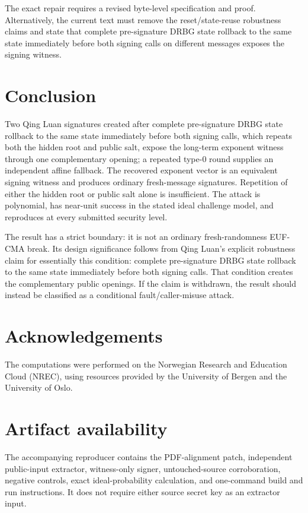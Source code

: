 \documentclass[11pt,a4paper]{article}
\begin{document}
The exact repair requires a revised byte-level specification and proof.
Alternatively, the current text must remove the reset/state-reuse robustness
claims and state that complete pre-signature DRBG state rollback to the same
state immediately before both signing calls on different messages exposes the
signing witness.

\section{Conclusion}

Two Qing Luan signatures created after complete pre-signature DRBG state
rollback to the same state immediately before both signing calls, which repeats
both the hidden root and public salt, expose the
long-term exponent witness through one complementary opening; a repeated
type-0 round supplies an independent affine fallback.  The recovered exponent
vector is an equivalent signing witness and produces ordinary fresh-message
signatures.  Repetition of either the hidden root or public salt alone is
insufficient.  The attack is polynomial, has near-unit success in the stated
ideal challenge model, and reproduces at every submitted security level.

The result has a strict boundary: it is not an ordinary fresh-randomness
EUF-CMA break.  Its design significance follows from Qing Luan's explicit
robustness claim for essentially this condition: complete pre-signature DRBG
state rollback to the same state immediately before both signing calls.  That
condition creates the complementary public openings.  If the claim is
withdrawn, the result should instead be classified as a conditional
fault/caller-misuse attack.

\section*{Acknowledgements}

The computations were performed on the Norwegian Research and Education Cloud
(NREC), using resources provided by the University of Bergen and the University
of Oslo.

\section*{Artifact availability}

The accompanying reproducer contains the PDF-alignment patch, independent
public-input extractor, witness-only signer, untouched-source corroboration,
negative controls, exact ideal-probability calculation, and one-command build
and run instructions.  It does not require either source secret key as an
extractor input.
\end{document}
